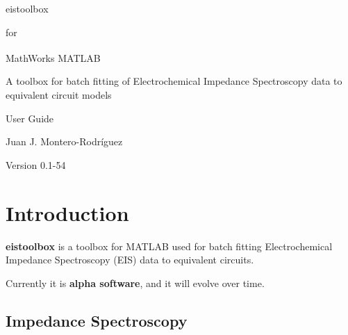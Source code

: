 \documentclass[10pt,a4paper,oneside]{book}
\begin{document}
\setlength{\parindent}{0pt}
\setlength{\parskip}{6pt}

 \vspace*{3cm}
	
 \begin{center}
 	\Huge eistoolbox \par
 \end{center}
 \begin{center}
 	\LARGE for \par
 \end{center}
 \begin{center}
 	\Huge MathWorks\textsuperscript{\textregistered} MATLAB \par
 \end{center}
 
 \vspace*{2cm}
 
\begin{center}
	\Large A toolbox for batch fitting of Electrochemical Impedance Spectroscopy data to equivalent circuit models
\end{center} 
 
 \vspace*{2cm}
 
 \begin{center}
 	\Huge User Guide \par
 \end{center}
 \begin{center}
 	\LARGE Juan J. Montero-Rodríguez \par
 \end{center}
 
 \vspace*{4cm}
 
 \begin{center}
 	\Large Version 0.1-54
 \end{center}

\clearpage

\tableofcontents

\chapter{Introduction}

\textbf{eistoolbox} is a toolbox for MATLAB\textregistered{} used for batch fitting Electrochemical Impedance Spectroscopy (EIS) data to equivalent circuits. 

Currently it is \textbf{alpha software}, and it will evolve over time.

\section{Impedance Spectroscopy}
\end{document}
